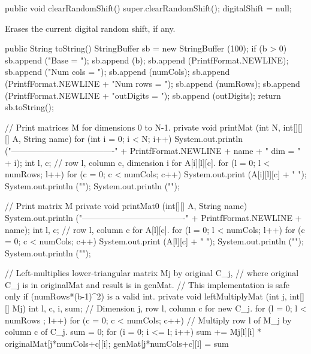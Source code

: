\begin{hide}\begin{code}

   public void clearRandomShift() {
      super.clearRandomShift();
      digitalShift = null;
   }
\end{code}
\begin{tabb}
   Erases the current digital random shift, if any.
\end{tabb}\end{hide}
\begin{code}\begin{hide}

   public String toString() {
      StringBuffer sb = new StringBuffer (100);
      if (b > 0) {
         sb.append ("Base = ");   sb.append (b);
         sb.append (PrintfFormat.NEWLINE);
      }
      sb.append ("Num cols = ");   sb.append (numCols);
      sb.append (PrintfFormat.NEWLINE + "Num rows = ");
      sb.append (numRows);
      sb.append (PrintfFormat.NEWLINE + "outDigits = ");
      sb.append (outDigits);
      return sb.toString();
   }


   // Print matrices M for dimensions 0 to N-1.
   private void printMat (int N, int[][][] A, String name) {
      for (int i = 0; i < N; i++) {
         System.out.println ("-------------------------------------" +
            PrintfFormat.NEWLINE + name + "   dim = " + i);
         int l, c;   // row l, column c, dimension i for A[i][l][c].
         for (l = 0; l < numRows; l++) {
            for (c = 0; c < numCols; c++) {
               System.out.print (A[i][l][c] + "  ");
            }
            System.out.println ("");
         }
      }
      System.out.println ("");
   }


   // Print matrix M
   private void printMat0 (int[][] A, String name) {
         System.out.println ("-------------------------------------" +
                             PrintfFormat.NEWLINE + name);
         int l, c;   // row l, column c for A[l][c].
         for (l = 0; l < numCols; l++) {
            for (c = 0; c < numCols; c++) {
               System.out.print (A[l][c] + "  ");
            }
            System.out.println ("");
         }
      System.out.println ("");
   }


   // Left-multiplies lower-triangular matrix Mj by original C_j,
   // where original C_j is in originalMat and result is in genMat.
   // This implementation is safe only if (numRows*(b-1)^2) is a valid int.
   private void leftMultiplyMat (int j, int[][] Mj) {
      int l, c, i, sum;   // Dimension j, row l, column c for new C_j.
      for (l = 0; l < numRows ; l++) {
         for (c = 0; c < numCols; c++) {
            // Multiply row l of M_j by column c of C_j.
            sum = 0;
            for (i = 0; i <= l; i++)
               sum += Mj[l][i] * originalMat[j*numCols+c][i];
            genMat[j*numCols+c][l] = sum %
         }
      }
   }



\end{hide}
\end{code}
